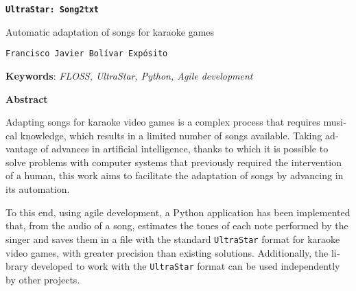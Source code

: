 \begin{otherlanguage}{english}


\begin{center}
\large\bfseries 
\texttt{\normalfont\large\bfseries UltraStar: Song2txt}
	
Automatic adaptation of songs for karaoke games
\end{center}

\begin{center}
	\texttt{\normalfont Francisco Javier Bolívar Expósito}
\end{center}


\vspace{0.5cm}
\noindent\textbf{Keywords}: \textit{FLOSS, UltraStar, Python, Agile development}
\vspace{0.7cm}

\noindent\textbf{Abstract}

Adapting songs for karaoke video games is a complex process that requires musical knowledge, which results in a limited number of songs available. Taking advantage of advances in artificial intelligence, thanks to which it is possible to solve problems with computer systems that previously required the intervention of a human, this work aims to facilitate the adaptation of songs by advancing in its automation.

To this end, using agile development, a Python application has been implemented that, from the audio of a song, estimates the tones of each note performed by the singer and saves them in a file with the standard \texttt{UltraStar} format for karaoke video games, with greater precision than existing solutions. Additionally, the library developed to work with the \texttt{UltraStar} format can be used independently by other projects.

\end{otherlanguage}